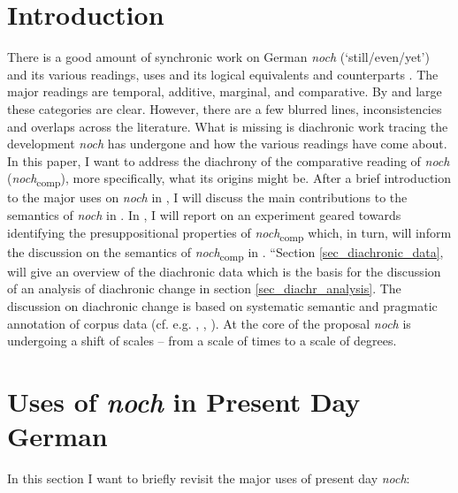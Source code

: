 \documentclass[output=paper,
modfonts
]{langscibook}
\author{Martin Kopf-Giammanco\affiliation{Universität des Saarlandes}}
\begin{document}
\maketitle

\section{Introduction}\label{sec_intro}
There is a good amount of synchronic work on German \textit{noch} (`still/even/yet') and its various readings, uses and its logical equivalents and counterparts \citep[e.g.][]{koenig1977,loebner1989,Ippolito2007,umbach2009a_comp,umbach2009b_add,umbach2012,beck2016a_sub,beck2016b_disc}. The major readings are temporal, additive, marginal, and comparative. By and large these categories are clear. However, there are a few blurred lines, inconsistencies and overlaps across the literature. What is missing is diachronic work tracing the development \textit{noch} has undergone and how the various readings have come about. In this paper, I want to address the diachrony of the comparative reading of \textit{noch} (\textit{noch}\textsubscript{comp}), more specifically, what its origins might be. After a brief introduction to the major uses on \textit{noch} in , I will discuss the main contributions to the semantics of \textit{noch} in . In , I will report on an experiment geared towards identifying the presuppositional properties of \textit{noch}\textsubscript{comp} which, in turn, will inform the discussion on the semantics of \textit{noch}\textsubscript{comp} in . “Section \ref{sec_diachronic_data}, will give an overview of the diachronic data which is the basis for the discussion of an analysis of diachronic change in section \ref{sec_diachr_analysis}. The discussion on diachronic change is based on systematic semantic and pragmatic annotation of corpus data (cf. e.g. \citet{gergel_kopf-giammanco_watkins_2017}, \citet{gergel_bluemel_kopf_2016}, \citet{gergel_etal_2017}). At the core of the proposal \textit{noch} is undergoing a shift of scales -- from a scale of times to a scale of degrees.

\section{Uses of \textit{noch} in Present Day German} \label{sec_major_readings}

In this section I want to briefly revisit the major uses of present day \textit{noch}:
\end{document}
